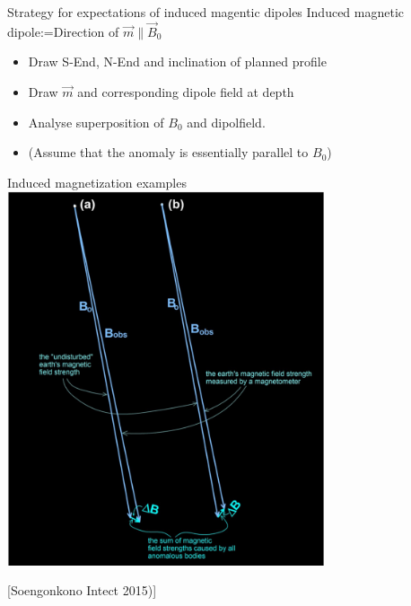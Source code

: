 \begin{frame}
    \begin{PointSix}{Strategy for expectations of induced magentic dipoles}
      \alert{Induced magnetic dipole:=Direction of $\vec{m} \parallel \vec{B}_0$}
      \small
      \begin{itemize}
        \item Draw S-End, N-End and inclination of planned profile
        \item Draw $\vec{m}$ and corresponding dipole field at depth
        \item Analyse superposition of $B_0$ and dipolfield. 
        \item (Assume that the anomaly is essentially parallel to $B_0$)
      \end{itemize}
    \end{PointSix}
\end{frame}

\begin{frame}
  \begin{PointSix}{Induced magnetization examples}
    \includegraphics[width=0.7\textwidth]{Figures/Magnetics/AlmostParallel.png}

    [Soengonkono Intect 2015)]
  \end{PointSix}
\end{frame}

